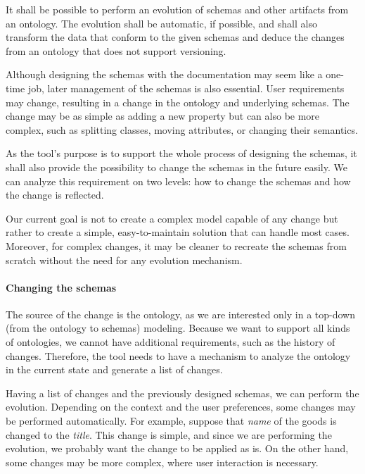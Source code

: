 \begin{requirement}
    It shall be possible to perform an evolution of schemas and other artifacts from an ontology. The evolution shall be automatic, if possible, and shall also transform the data that conform to the given schemas and deduce the changes from an ontology that does not support versioning.
    \label{requirement:evolution}
\end{requirement}

Although designing the schemas with the documentation may seem like a one-time job, later management of the schemas is also essential. User requirements may change, resulting in a change in the ontology and underlying schemas. The change may be as simple as adding a new property but can also be more complex, such as splitting classes, moving attributes, or changing their semantics.

As the tool's purpose is to support the whole process of designing the schemas, it shall also provide the possibility to change the schemas in the future easily. We can analyze this requirement on two levels: how to change the schemas and how the change is reflected.

Our current goal is not to create a complex model capable of any change but rather to create a simple, easy-to-maintain solution that can handle most cases. Moreover, for complex changes, it may be cleaner to recreate the schemas from scratch without the need for any evolution mechanism.

\paragraph{Changing the schemas} The source of the change is the ontology, as we are interested only in a top-down (from the ontology to schemas) modeling. Because we want to support all kinds of ontologies, we cannot have additional requirements, such as the history of changes. Therefore, the tool needs to have a mechanism to analyze the ontology in the current state and generate a list of changes.

Having a list of changes and the previously designed schemas, we can perform the evolution. Depending on the context and the user preferences, some changes may be performed automatically. For example, suppose that \textit{name} of the goods is changed to the \textit{title}. This change is simple, and since we are performing the evolution, we probably want the change to be applied as is. On the other hand, some changes may be more complex, where user interaction is necessary.

